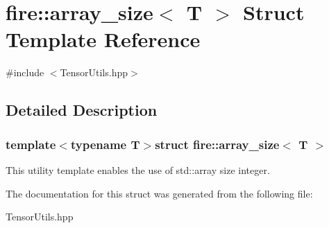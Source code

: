 \hypertarget{a00007}{}\section{fire\+:\+:array\+\_\+size$<$ T $>$ Struct Template Reference}
\label{a00007}


{\ttfamily \#include $<$Tensor\+Utils.\+hpp$>$}



\subsection{Detailed Description}
\subsubsection*{template$<$typename T$>$struct fire\+::array\+\_\+size$<$ T $>$}

This utility template enables the use of std\+::array size integer. 

The documentation for this struct was generated from the following file\+:\begin{DoxyCompactItemize}
\item 
Tensor\+Utils.\+hpp\end{DoxyCompactItemize}
